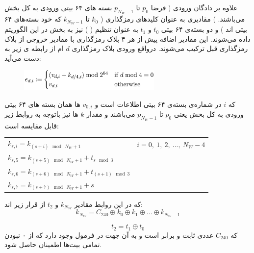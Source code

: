 علاوه بر دادگان ورودی ( فرضا 
$p_0$ 
تا
$p_{N_W - 1}$
بسته های ۶۴ بیتی ورودی به کل بخش 
می‌باشند.
)
مقادیری به عنوان کلیدهای رمزگذاری (
$k_0$ 
تا
$k_{N_W - 1}$
که خود بسته‌های ۶۴ بیتی اند
)
و
دو بسته‌ی ۶۴ بیتی 
$t_0$ 
و
$t_1$
به عنوان تنظیم (
) 
نیز به ‌بخش 
در این الگوریتم داده می‌شوند. این مقادیر اضافه پیش از هر ۴ بلاک رمزگذاری با مقادیر خروجی از بلاک رمزگذاری قبل ترکیب می‌شوند. درواقع ورودی بلاک رمزگذاری $d$ ام از رابطه ی زیر به دست می‌آید:
\begin{figure}[H]
	\centering
	\includegraphics[width=7cm]{Images/Introduction/subkey_equation_1.png}	
	
\end{figure}
که $i$ در شماره‌ی بسته‌ی ۶۴ بیتی اطلاعات است و $v_{0,i}$ ها همان بسته های ۶۴ بیتی ورودی به کل بخش 
یعنی 
$p_0$ 
تا
$p_{N_W - 1}$
می‌باشند  و مقدار $k$ ها نیز با‌توجه به روابط زیر قابل مقایسه است:
	\begin{latin}
		\begin{center}
			\begin{tabular}{l l}
				$k_{s, i} = k_{(s+i) \mod\ N_W+1} $ \hspace{15mm} & $  i = 0,\ 1,\ 2,\ ... ,\ N_W-4 $ \\
				$k_{s, 5} = k_{(s+5) \mod\ N_W+1} + t_{s \mod 3}$ & \\
				$k_{s, 6} = k_{(s+6) \mod\ N_W+1} + t_{(s+1) \mod 3}$ & \\
				$k_{s, 7} = k_{(s+7) \mod\ N_W+1} + s $ & \\
				
			\end{tabular}
		\end{center}
	\end{latin}

که در این روابط مقادیر $k_{N_W}$ و
$t_2$
از قرار زیر اند:
$$
k_{N_W} = C_{240} \oplus k_0 \oplus k_1 \oplus ... \oplus k_{N_W - 1}
$$

$$
t_2 = t_1 \oplus t_0
$$
که $ C_{240} $ عددی ثابت و برابر  است و به آن جهت در فرمول وجود دارد که از ۰ نبودن تمامی بیت‌ها اطمینان حاصل شود.

\subsection{
}

\subsection{
}
